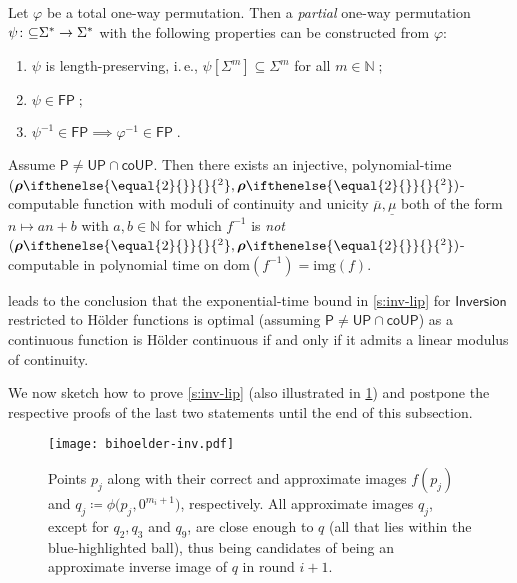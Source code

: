 \documentclass{CSML}
\newcommand{\IN}{\mathbb{N}}
\newcommand{\parcol}{\colon\mathnormal\subseteq}
\newcommand{\dom}{\mathrm{dom}} %
\newcommand{\img}{\mathrm{img}} %
\newcommand{\range}{\img}
\newcommand{\Sast}{\Sigma^\ast}
\newcommand{\co}{\mathsf{co}}
\newcommand{\PTime}{\mathsf{P}}
\newcommand{\FPTime}{\mathsf{FP}}
\newcommand{\UPTime}{\mathsf{UP}}
\newcommand{\modcont}{\overline{\mu}}
\newcommand{\modsu}{\underline{\mu}}
\newcommand{\realrep}[1][\empty]{ \bm{\rho}\ifnotempty{#1}{^{#1}} }
\newcommand{\ifnotempty}[2]{ \ifthenelse{ \equal{#1}{\empty} }{}{#2} }
\newcommand{\dfeq}{\coloneqq}
\newcommand{\ie}{\mbox{i.\,e.}\xspace}
\newcommand{\dsoinv}{\mathsf{Inversion}}
\newcommand{\eqnsp}{\;}
\begin{document}
\begin{lem} \label{s:owp-lengthpreserving}
Let $\varphi$ be a total one-way permutation.
Then a \emph{partial} one-way permutation \\ $\psi \parcol \Sast \to \Sast$ with
the following properties can be constructed from $\varphi$:
\begin{enumerate}
\item $\psi$ is length-preserving, \ie,
	$\psi[\Sigma^m] \subseteq \Sigma^m$ for all $m \in \IN \eqnsp ;$
\item $\psi \in \FPTime \eqnsp ;$
\item $\psi^{-1} \in \FPTime \implies \varphi^{-1} \in \FPTime \eqnsp .$
\end{enumerate}
\end{lem}

\begin{cor} \label{s:owp-bi-hoelder}
Assume $\PTime \neq \UPTime \cap \co\UPTime$.
Then there exists an injective, polynomial-time
$(\realrep[2],\realrep[2])$-computable function with moduli of continuity and
unicity $\modcont,\modsu$ both of the form $n \mapsto an+b$ with $a,b \in \IN$
for which $f^{-1}$ is \emph{not} $(\realrep[2],\realrep[2])$-computable in
polynomial time on $\dom(f^{-1}) = \range(f)$.
\end{cor}

 leads to the conclusion that the exponential-time
bound in \cref{s:inv-lip} for $\dsoinv$ restricted to Hölder functions
is optimal (assuming $\PTime \neq \UPTime \cap \co\UPTime$) as a continuous
function is Hölder continuous if and only if it admits a linear modulus of
continuity.

We now sketch how to prove \cref{s:inv-lip} (also illustrated in
\cref{fig:inv-sketch}) and postpone the respective proofs of the last two
statements until the end of this subsection.

\begin{figure}[htb]
	\centering
  \texttt{[image: bihoelder-inv.pdf]}
	\caption{Points $p_j$ along with their correct and approximate images
		$f(p_j)$ and $q_j \dfeq \phi \big( p_j, 0^{m_i+1} \big)$,
		respectively. All approximate images $q_j$, except for $q_2, q_3$ and
		$q_9$, are close enough to $q$ (all that lies within the
		blue-highlighted ball), thus being candidates of being an approximate
		inverse image of $q$ in round $i+1$.}
	\label{fig:inv-sketch}
\end{figure}
\end{document}
